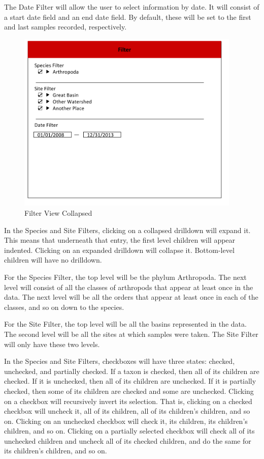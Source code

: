The Date Filter will allow the user to select information by date. It will consist of a start date field and an end date field. By default, these will be set to the first and last samples recorded, respectively.

\begin{figure}[h]
	\centering
	\includegraphics[width=0.95\textwidth]{filter.png}
	\captionsetup{justification=centering}
	\caption{
		Filter View Collapsed
	}
	\label{fig:filter_mockup}
\end{figure}

In the Species and Site Filters, clicking on a collapsed drilldown will expand it. This means that underneath that entry, the first level children will appear indented. Clicking on an expanded drilldown will collapse it. Bottom-level children will have no drilldown.

For the Species Filter, the top level will be the phylum Arthropoda. The next level will consist of all the classes of arthropods that appear at least once in the data. The next level will be all the orders that appear at least once in each of the classes, and so on down to the species.

For the Site Filter, the top level will be all the basins represented in the data. The second level will be all the sites at which samples were taken. The Site Filter will only have these two levels.

In the Species and Site Filters, checkboxes will have three states: checked, unchecked, and partially checked. If a taxon is checked, then all of its children are checked. If it is unchecked, then all of its children are unchecked. If it is partially checked, then some of its children are checked and some are unchecked. Clicking on a checkbox will recursively invert its selection. That is, clicking on a checked checkbox will uncheck it, all of its children, all of its children’s children, and so on. Clicking on an unchecked checkbox will check it, its children, its children’s children, and so on. Clicking on a partially selected checkbox will check all of its unchecked children and uncheck all of its checked children, and do the same for its children’s children, and so on.

